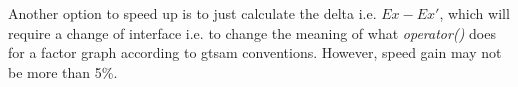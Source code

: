 \documentclass[10pt,oneside,letterpaper]{article}
\begin{document}
Another option to speed up is to just calculate the delta i.e. $Ex - Ex'$, which will require a change of interface i.e. to change the meaning of what \emph{operator()} does for a factor graph according to gtsam conventions. However, speed gain may not be more than 5\%.




\end{document}
